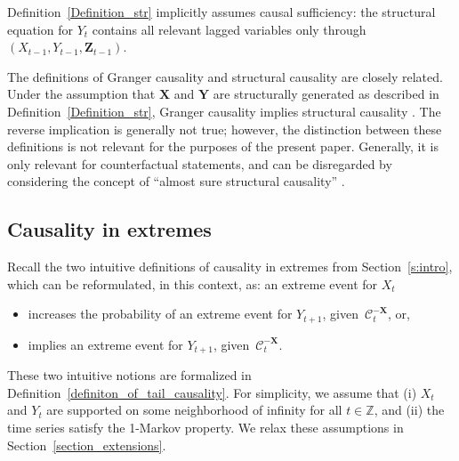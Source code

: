 \documentclass[a4paper,11pt]{article}
\begin{document}
Definition~\ref{Definition_str} implicitly assumes causal sufficiency: the structural equation for \(Y_t\) contains all relevant lagged variables only through \((X_{t-1},Y_{t-1},\mathbf Z_{t-1})\). 

The definitions of Granger causality and structural causality are closely related. Under the assumption that $\textbf{X}$ and $\textbf{Y}$ are structurally generated as described in Definition~\ref{Definition_str}, Granger causality implies structural causality \citep[Proposition 1, Chapter 22.4]{berzuini2012causality}. The reverse implication is generally not true; however, the distinction between these definitions is not relevant for the purposes of the present paper. Generally, it is only relevant for counterfactual statements, and can be disregarded by considering the concept of ``almost sure structural causality'' \citep[Section 3.1]{white2010granger}.



\subsection{Causality in extremes}
\label{section_granger_cusality_in_tail}
Recall the two intuitive definitions of causality in extremes from Section~\ref{s:intro}, which can be reformulated, in this context, as: an extreme event for $X_t$ 
\begin{itemize}
    \item increases the probability of an extreme event for $Y_{t+1}$, given~$\mathcal{C}^{-\textbf{X}}_{t}$, or,
    \item implies an extreme event for $Y_{t+1}$, given~$\mathcal{C}^{-\textbf{X}}_{t}$.
\end{itemize}
These two intuitive notions are formalized in Definition~\ref{definiton_of_tail_causality}. For simplicity, we assume that (i) \(X_t\) and \(Y_t\) are supported on some neighborhood 
of infinity for all \(t\in\mathbb Z\), and (ii) the time series satisfy the 1-Markov property. We relax these assumptions in Section~\ref{section_extensions}. 
\end{document}
